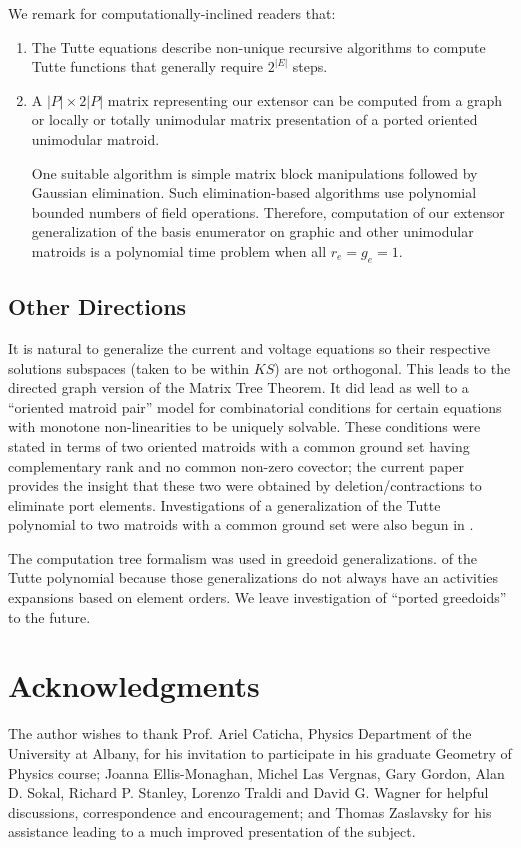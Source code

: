 \documentclass[12pt]{article}
\theoremstyle{definition}
\newcommand{\FieldK}{\ensuremath{K}}
\newcommand{\Card}[1]{\ensuremath{{\left|#1\right|}}}
\begin{document}
We remark for computationally-inclined readers that: 
\begin{enumerate}
\item The Tutte equations
describe non-unique recursive algorithms to compute Tutte functions
that generally require $2^\Card{E}$
steps. 
\item  A $\Card{P}\times 2\Card{P}$ matrix representing our
extensor 
can be computed from a 
graph or locally or totally unimodular 
matrix presentation of a ported oriented unimodular matroid.

One suitable algorithm is simple matrix block manipulations followed by
Gaussian elimination.  Such elimination-based algorithms
use polynomial bounded numbers of field operations.  Therefore, computation
of our extensor generalization of the basis enumerator on graphic
and other unimodular matroids is a polynomial time
problem when all $r_e=g_e=1$.

\end{enumerate}

\subsection{Other Directions}
\label{Peripheral}

It is natural to generalize the current and voltage equations 
so their respective solutions subspaces (taken to be within $\FieldK S$)
are 
not orthogonal\cite{sdcBDIMatroid}.  
This leads to the directed graph version of the Matrix Tree
Theorem.  It did lead as well to a ``oriented matroid pair'' model for 
combinatorial conditions
for certain equations with monotone non-linearities to be uniquely 
solvable\cite{sdcOMP}.  These conditions were stated in terms of
two oriented matroids with a common ground set
having complementary rank and no common non-zero covector; the current paper 
provides the insight that these two were obtained by deletion/contractions
to eliminate port elements.  Investigations of a generalization of the 
Tutte polynomial to two matroids with a common ground set were also
begun in \cite{WelshKayibiLinking}.

The computation tree formalism was used in
greedoid generalizations\cite{GordonMcMachonGreedoid}.
of the Tutte polynomial because those generalizations do not
always have an activities expansions based on element orders.
We leave investigation of ``ported greedoids'' to the future.

\section{Acknowledgments}

The author wishes to thank Prof. Ariel Caticha, Physics Department of
the University at Albany, for his invitation to participate in his
graduate Geometry of Physics course; Joanna Ellis-Monaghan, Michel Las
Vergnas, Gary Gordon, Alan D. Sokal, Richard P. Stanley, Lorenzo
Traldi and David G. Wagner for helpful discussions, correspondence and
encouragement; and Thomas Zaslavsky for his assistance leading to a
much improved presentation of the subject.

%


\end{document}
